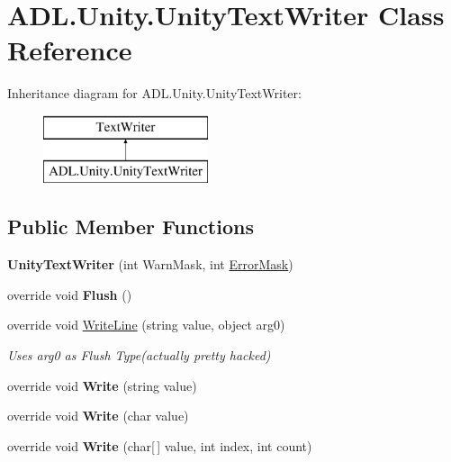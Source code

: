 \hypertarget{class_a_d_l_1_1_unity_1_1_unity_text_writer}{}\section{A\+D\+L.\+Unity.\+Unity\+Text\+Writer Class Reference}
\label{class_a_d_l_1_1_unity_1_1_unity_text_writer}
Inheritance diagram for A\+D\+L.\+Unity.\+Unity\+Text\+Writer\+:\begin{figure}[H]
\begin{center}
\leavevmode
\includegraphics[height=2.000000cm]{class_a_d_l_1_1_unity_1_1_unity_text_writer}
\end{center}
\end{figure}
\subsection*{Public Member Functions}
\begin{DoxyCompactItemize}
\item 
\mbox{\label{class_a_d_l_1_1_unity_1_1_unity_text_writer_ad037515e513a7f4c94d4cb2caf58b422}} 
{\bfseries Unity\+Text\+Writer} (int Warn\+Mask, int \mbox{\hyperlink{class_a_d_l_1_1_unity_1_1_unity_text_writer_a150a993a52f0ede7a6f8ba04728b4bfe}{Error\+Mask}})
\item 
\mbox{\label{class_a_d_l_1_1_unity_1_1_unity_text_writer_ad62666e8a12f473f34780dbfdbc71975}} 
override void {\bfseries Flush} ()
\item 
override void \mbox{\hyperlink{class_a_d_l_1_1_unity_1_1_unity_text_writer_a12b1bcfd083d9e771330d95d1857e569}{Write\+Line}} (string value, object arg0)
\begin{DoxyCompactList}\small\item\em Uses arg0 as Flush Type(actually pretty hacked) \end{DoxyCompactList}\item 
\mbox{\label{class_a_d_l_1_1_unity_1_1_unity_text_writer_ad951026a7b9df781b94fbc9a5274ac51}} 
override void {\bfseries Write} (string value)
\item 
\mbox{\label{class_a_d_l_1_1_unity_1_1_unity_text_writer_a9636a16d9e1f9b04d76d4087688bac3a}} 
override void {\bfseries Write} (char value)
\item 
\mbox{\label{class_a_d_l_1_1_unity_1_1_unity_text_writer_ace3ec2f343589f5a1d92145f5f61fb47}} 
override void {\bfseries Write} (char\mbox{[}$\,$\mbox{]} value, int index, int count)
\end{DoxyCompactItemize}

